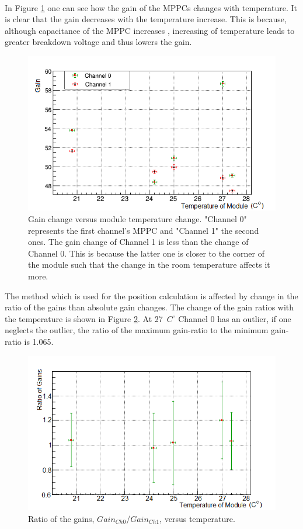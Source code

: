 \documentclass[a4paper]{article}\linespread{1.4}
\begin{document}
\\In Figure \ref{fig:mea} one can see how the gain of the MPPCs changes with temperature. It is clear that the gain decreases with the temperature increase. This is because, although capacitance of the MPPC increases \cite{123}, increasing of temperature leads to greater breakdown voltage \cite{1234} and thus lowers the gain.
\begin{figure}[] \centering \includegraphics[width=130mm,scale=1.0]{figures/rvsm.png} \caption{Gain change versus module temperature change. "Channel 0"  represents the first channel's MPPC and "Channel 1" the second ones. The gain change of Channel 1 is less than the change of Channel 0. This is because the latter one is closer to the corner of the module such that the change in the room temperature affects it more.} \label{fig:mea} \end{figure}  

The method which is used for the position calculation is affected by change in the ratio of the gains than absolute gain changes. The change of the gain ratios with the temperature is shown in Figure \ref{fig:ratio}. At 27~$C^{\circ}$ Channel 0 has an outlier, if one neglects the outlier, the ratio of the maximum gain-ratio to the minimum gain-ratio is 1.065.
 \begin{figure}[] \centering \includegraphics[width=130mm,scale=1.0]{figures/ratiot.png} \caption{Ratio of the gains, $Gain_{Ch0}$/$Gain_{Ch1}$, versus temperature.} \label{fig:ratio} \end{figure}  
\end{document}
